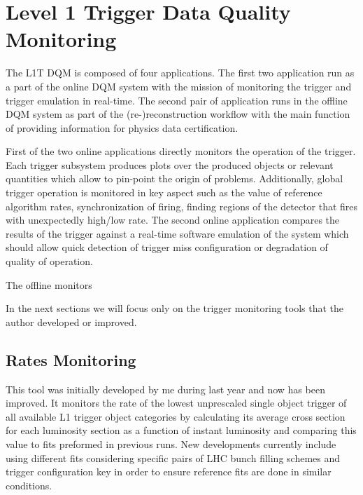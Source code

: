 \section{Level 1 Trigger Data Quality Monitoring}


The \acrfull{L1T} \acrfull{DQM} is composed of four applications. The first two application run as a part of the online \gls{DQM} system with the mission of monitoring the trigger and trigger emulation in real-time. The second pair of application runs in the offline \gls{DQM} system as part of the (re-)reconstruction workflow with the main function of providing information for physics data certification.

First of the two online applications directly monitors the operation of the trigger. Each trigger subsystem produces plots over the produced objects or relevant quantities which allow to pin-point the origin of problems. Additionally, global trigger operation is monitored in key aspect such as the value of reference algorithm rates, synchronization of firing, finding regions of the detector that fires with unexpectedly high/low rate. The second online application compares the results of the trigger against a real-time software emulation of the system which should allow quick detection of trigger miss configuration or degradation of quality of operation.

The offline monitors %

In the next sections we will focus only on the trigger monitoring tools that the author developed or improved.

\subsection{Rates Monitoring}


This tool was initially developed by me during last year and now has been improved. It monitors the rate of the lowest unprescaled single object trigger of all available L1 trigger object categories by calculating its
average cross section for each luminosity section as a function of instant luminosity and comparing this value to
fits preformed in previous runs. New developments currently include using different fits considering specific pairs of
LHC bunch filling schemes and trigger configuration key in order to ensure reference fits are done in similar conditions.

